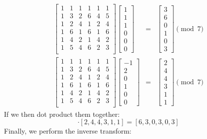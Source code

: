 \documentclass[11pt]{article}
\begin{document}
\begin{enumerate}
\begin{eqnarray*}
\begin{bmatrix}
1&1&1&1&1&1\\
1&3&2&6&4&5\\
1&2&4&1&2&4\\
1&6&1&6&1&6\\
1&4&2&1&4&2\\
1&5&4&6&2&3\\
\end{bmatrix}
\begin{bmatrix}
1\\
1\\
1\\
0\\
0\\
0
\end{bmatrix} &=& 
\begin{bmatrix}
3\\
6\\
0\\
1\\
0\\
3
\end{bmatrix}
\pmod{7}\\
\begin{bmatrix}
1&1&1&1&1&1\\
1&3&2&6&4&5\\
1&2&4&1&2&4\\
1&6&1&6&1&6\\
1&4&2&1&4&2\\
1&5&4&6&2&3\\
\end{bmatrix}
\begin{bmatrix}
-1\\
2\\
0\\
1\\
0\\
0
\end{bmatrix} &=& 
\begin{bmatrix}
2\\
4\\
4\\
3\\
1\\
1
\end{bmatrix}
\pmod{7}
\end{eqnarray*}
If we then dot product them together:
\begin{equation*}
[3,6,0,1,0,3] \cdot [2,4,4,3,1,1] = [6,3,0,3,0,3]
\end{equation*}
Finally, we perform the inverse transform:

\end{enumerate}
\end{document}
